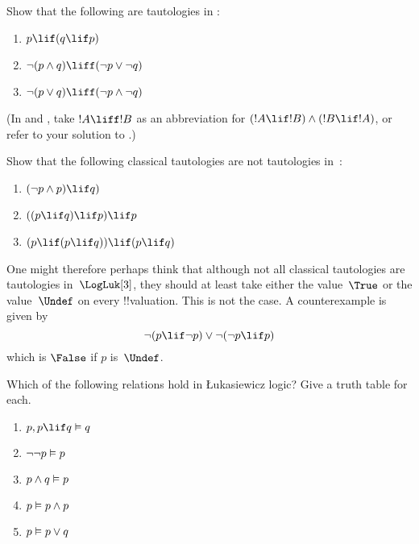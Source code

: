 \documentclass[../../../include/open-logic-section]{subfiles}
\begin{document}
\begin{prob}
  Show that the following are tautologies in \LogLuk[3]:
  \begin{enumerate}
    \item $p \lif (q \lif p)$
    \item\label{mvl:thr:luk:prob:luk-taut-2} $\lnot(p \land q) \liff (\lnot p \lor \lnot q)$
    \item\label{mvl:thr:luk:prob:luk-taut-3} $\lnot(p \lor q) \liff (\lnot p \land \lnot q)$
  \end{enumerate}
  (In  and
  , take $!A \liff !B$ as an
  abbreviation for $(!A \lif !B) \land (!B \lif !A)$, or refer to your
  solution to .)
\end{prob}

\begin{prob}
  Show that the following classical tautologies are not tautologies in~\LogLuk[3]:
  \begin{enumerate}
    \item $(\lnot p \land p) \lif q)$
    \item $((p \lif q) \lif p) \lif p$
    \item $(p \lif (p \lif q)) \lif (p \lif q)$
  \end{enumerate}
\end{prob}

One might therefore perhaps think that although not all classical
tautologies are tautologies in~$\LogLuk[3]$, they should at least take
either the value~$\True$ or the value~$\Undef$ on every
!!{valuation}. This is not the case. A counterexample is given by
\[
  \lnot(p \lif \lnot p) \lor \lnot(\lnot p \lif p)
\]
which is $\False$ if $p$ is~$\Undef$.

\begin{prob}
  Which of the following relations hold in \L ukasiewicz logic? Give a truth table for each.
  \begin{enumerate}
    \item $p, p \lif q \Entails q$
    \item $\lnot\lnot p \Entails p$
    \item $p \land q \Entails p$
    \item $p \Entails p \land p$
    \item $p \Entails p \lor q$
  \end{enumerate}
\end{prob}
\end{document}
